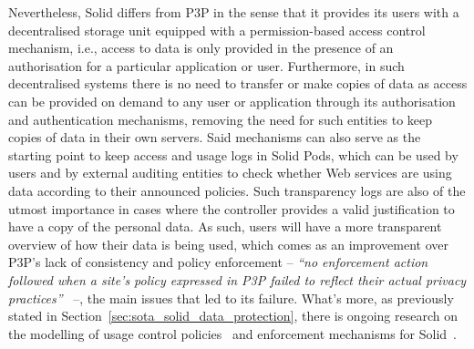 Nevertheless, Solid differs from P3P in the sense that it provides its users with a decentralised storage unit equipped with a permission-based access control mechanism, i.e., access to data is only provided in the presence of an authorisation for a particular application or user.
Furthermore, in such decentralised systems there is no need to transfer or make copies of data as access can be provided on demand to any user or application through its authorisation and authentication mechanisms, removing the need for such entities to keep copies of data in their own servers.
Said mechanisms can also serve as the starting point to keep access and usage logs in Solid Pods, which can be used by users and by external auditing entities to check whether Web services are using data according to their announced policies.
Such transparency logs are also of the utmost importance in cases where the controller provides a valid justification to have a copy of the personal data. 
As such, users will have a more transparent overview of how their data is being used, which comes as an improvement over P3P’s lack of consistency and policy enforcement -- \textit{``no enforcement action followed when a site's policy expressed in P3P failed to reflect their actual privacy practices''}~\citep{cranor_platform_2002} --, the main issues that led to its failure.
What's more, as previously stated in Section~\ref{sec:sota_solid_data_protection}, there is ongoing research on the modelling of usage control policies~\citep{akaichi_gucon_2023} and enforcement mechanisms for Solid~\citep{slabbinck_rulebased_2023}.



